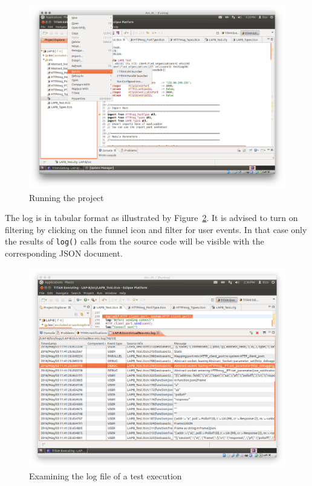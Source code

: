 \documentclass[a4paper]{article}
\begin{document}
\begin{figure}[H]
  \centering
  \includegraphics[width=\textwidth]{figures/run.png}
  \caption{Running the project}
  \label{fig:run}
\end{figure}

The log is in tabular format as illustrated by Figure~\ref{fig:log}. It is advised to turn on filtering by clicking on the funnel icon and filter for user events. In that case only the results of \verb!log()! calls from the source code will be visible with the corresponding JSON document.

\begin{figure}[H]
  \centering
  \includegraphics[width=\textwidth]{figures/log.png}
  \caption{Examining the log file of a test execution}
  \label{fig:log}
\end{figure}
\end{document}
